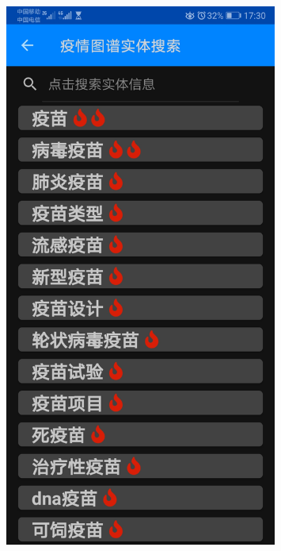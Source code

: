 \documentclass[UTF8]{article}
\begin{document}
\begin{figure}[htbp]
{\begin{minipage}[t]{0.25\linewidth}
    \includegraphics[width=0.8\textwidth]{nightmode3}
    \end{minipage}%
    }%
\end{figure}
\end{document}
